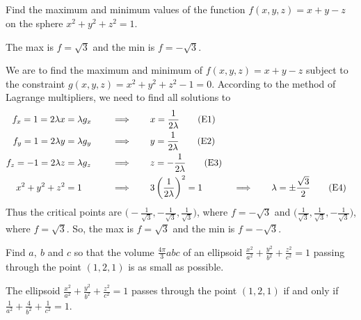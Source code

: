\subsection*{\Procedural}


\begin{question}
Find the maximum and minimum values of the function  
$f(x,y,z)=x+y-z$ on the sphere $x^2+y^2+z^2=1$.
\end{question}

%

\begin{answer}
The max is $f=\sqrt{3}$ and the min is $f=-\sqrt{3}$.
\end{answer}

\begin{solution}
We are to find the maximum and minimum of $f(x,y,z)=x+y-z$
subject to the constraint $g(x,y,z) = x^2+y^2+z^2 -1=0$.
According to the method of Lagrange multipliers, we need to find 
all solutions to
\begin{alignat*}{7}
f_x = 1 = 2\lambda x  &= \lambda g_x 
      \quad&&\implies\quad && x=\frac{1}{2\lambda} \tag{E1} \\ 
f_y = 1 = 2\lambda y &= \lambda g_y 
      \quad&&\implies\quad && y=\frac{1}{2\lambda}\tag{E2} \\ 
f_z = -1 = 2\lambda z &= \lambda g_z 
       \quad&&\implies\quad && z=-\frac{1}{2\lambda} \tag{E3} \\ 
x^2+y^2+z^2&=1 
       \quad&&\implies\quad &&3\left(\frac{1}{2\lambda}\right)^2=1
\quad&&\implies\quad & \lambda&=\pm\frac{\sqrt{3}}{2}\tag{E4}
\end{alignat*}
Thus the critical points are 
$\big(-\frac{1}{\sqrt{3}},-\frac{1}{\sqrt{3}},\frac{1}{\sqrt{3}}\big)$,
where $f=-\sqrt{3}$
and 
$\big(\frac{1}{\sqrt{3}},\frac{1}{\sqrt{3}},-\frac{1}{\sqrt{3}}\big)$,
where $f=\sqrt{3}$. So, the max is $f=\sqrt{3}$ and the min is 
$f=-\sqrt{3}$.
\end{solution}

\begin{question}
Find $a,\ b$ and $c$ so that the volume $\frac{4\pi}{3} abc$ of an ellipsoid
$\frac{x^2}{a^2}+\frac{y^2}{b^2}+\frac{z^2}{c^2}=1$ passing through
the point $(1,2,1)$ is as small as possible.
\end{question}

\begin{hint}
The ellipsoid $\frac{x^2}{a^2}+\frac{y^2}{b^2}+\frac{z^2}{c^2}=1$ passes 
through the point $(1,2,1)$ if and only if 
$\frac{1}{a^2}+\frac{4}{b^2}+\frac{1}{c^2}=1$.
\end{hint}

